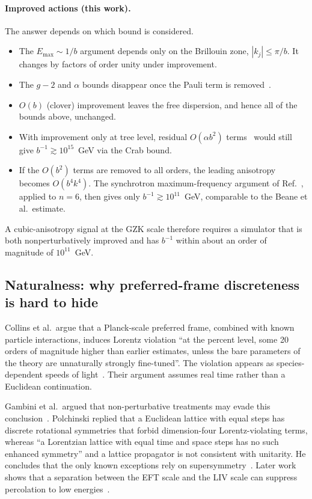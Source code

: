 \paragraph{Improved actions (this work).}
The answer depends on which bound is considered.
\begin{itemize}
\item The $E_{\max}\sim1/b$ argument depends only on the Brillouin zone, $|k_j|\le\pi/b$. It changes by factors of order unity under improvement.
\item The $g-2$ and $\alpha$ bounds disappear once the Pauli term is removed~\cite{Beane2014constraints}.
\item $O(b)$ (clover) improvement leaves the free dispersion, and hence all of the bounds above, unchanged.
\item With improvement only at tree level, residual $O(\alpha b^2)$ terms~\cite{Fodor2012light} would still give $b^{-1}\gtrsim10^{15}$~GeV via the Crab bound.
\item If the $O(b^2)$ terms are removed to all orders, the leading anisotropy becomes $O(b^4k^4)$. The synchrotron maximum-frequency argument of Ref.~\cite{Liberati2012scale}, applied to $n=6$, then gives only $b^{-1}\gtrsim10^{11}$~GeV, comparable to the Beane et al.\ estimate.
\end{itemize}
A cubic-anisotropy signal at the GZK scale therefore requires a simulator that is both nonperturbatively improved and has $b^{-1}$ within about an order of magnitude of $10^{11}$~GeV.

\subsection{Naturalness: why preferred-frame discreteness is hard to hide}
\label{sec:lattice-liv:natural}

Collins et al.\ argue that a Planck-scale preferred frame, combined with known particle interactions, induces Lorentz violation ``at the percent level, some 20 orders of magnitude higher than earlier estimates, unless the bare parameters of the theory are unnaturally strongly fine-tuned''. The violation appears as species-dependent speeds of light~\cite{Collins2004lorentz}. Their argument assumes real time rather than a Euclidean continuation.

Gambini et al.\ argued that non-perturbative treatments may evade this conclusion~\cite{Gambini2011small}. Polchinski replied that a Euclidean lattice with equal steps has discrete rotational symmetries that forbid dimension-four Lorentz-violating terms, whereas ``a Lorentzian lattice with equal time and space steps has no such enhanced symmetry'' and a lattice propagator is not consistent with unitarity. He concludes that the only known exceptions rely on supersymmetry~\cite{Polchinski2012comment}. Later work shows that a separation between the EFT scale and the LIV scale can suppress percolation to low energies~\cite{Belenchia2016lorentz}.

